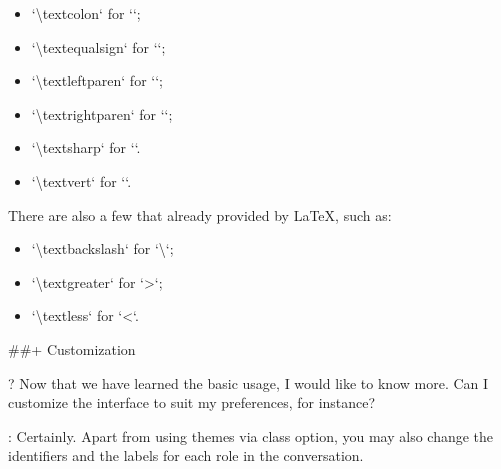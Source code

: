 \documentclass[%
  use style = classical,
  scroll,
]{Q-and-A}
\begin{document}
\begin{itemize}
\begin{itemize}
      \item `\textbackslash textcolon` for `\textcolon`;
      \item `\textbackslash textequalsign` for `\textequalsign`;
      \item `\textbackslash textleftparen` for `\textleftparen`;
      \item `\textbackslash textrightparen` for `\textrightparen`;
      \item `\textbackslash textsharp` for `\textsharp`.
      \item `\textbackslash textvert` for `\textvert`.
    \end{itemize}
    There are also a few that already provided by \LaTeX, such as:
    \begin{itemize}
      \item `\textbackslash textbackslash` for `\textbackslash`;
      \item `\textbackslash textgreater` for `\textgreater`;
      \item `\textbackslash textless` for `\textless`.
    \end{itemize}
  \end{itemize}


##+ {Customization}

?
  Now that we have learned the basic usage, I would like to know more. Can I customize the interface to suit my preferences, for instance?

:
  Certainly. Apart from using themes via class option, you may also change the identifiers and the labels for each role in the conversation.
\end{document}
